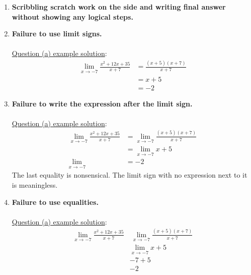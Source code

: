 \documentclass[reqno,psamsfonts]{amsart}
\theoremstyle{definition}
\theoremstyle{remark}
\numberwithin{equation}{section}
\begin{document}
\begin{enumerate}
\item \textbf{Scribbling scratch work on the side and writing final answer without showing any logical steps.}
\\
\item \textbf{Failure to use limit signs.}
\\
\\\underline{Question (a) example solution}:
\begin{align*}
\lim\limits_{x\to -7}\frac{x^2+12x+35}{x+7}&=\frac{(x+5)(x+7)}{x+7}\\
&=x+5\\
&=-2
\end{align*}


\item \textbf{Failure to write the expression after the limit sign.}
\\
\\\underline{Question (a) example solution}:
\begin{align*}
\lim\limits_{x\to -7}\frac{x^2+12x+35}{x+7}&=\lim\limits_{x\to-7}\frac{(x+5)(x+7)}{x+7}\\
&=\lim\limits_{x\to -7}x+5\\
\lim\limits_{x\to -7} &=-2
\end{align*}
The last equality is nonsensical. The limit sign with no expression next to it is meaningless.

\newpage
\item \textbf{Failure to use equalities.}
\\
\\\underline{Question (a) example solution}:
\begin{align*}
\lim\limits_{x\to -7}\frac{x^2+12x+35}{x+7}&\ \lim\limits_{x\to-7}\frac{(x+5)(x+7)}{x+7}\\
&\lim\limits_{x\to -7}x+5\\
&-7+5\\
&\boxed{-2}
\end{align*}


\end{enumerate}
\end{document}
